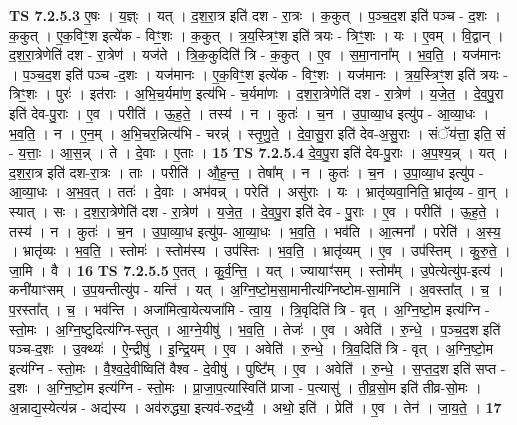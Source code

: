 \documentclass[17pt]{extarticle}
\begin{document}
                  \newline
                                \textbf{ TS 7.2.5.3} \newline
                  ए॒षः । य॒ज्ञ्ः । यत् । द॒श॒रा॒त्र इति॑ दश - रा॒त्रः । क॒कुत् । प॒ञ्च॒द॒श इति॑ पञ्च - द॒शः । क॒कुत् । ए॒क॒विꣳ॒॒श इत्ये॑क - विꣳ॒॒शः । क॒कुत् । त्र॒य॒स्त्रिꣳ॒॒श इति॑ त्रयः - त्रिꣳ॒॒शः । यः । ए॒वम् । वि॒द्वान् । द॒श॒रा॒त्रेणेति॑ दश - रा॒त्रेण॑ । यज॑ते । त्रि॒क॒कुदिति॑ त्रि - क॒कुत् । ए॒व । स॒मा॒नाना᳚म् । भ॒व॒ति॒ । यज॑मानः । प॒ञ्च॒द॒श इति॑ पञ्च -द॒शः । यज॑मानः । ए॒क॒विꣳ॒॒श इत्ये॑क - विꣳ॒॒शः । यज॑मानः । त्र॒य॒स्त्रिꣳ॒॒श इति॑ त्रयः - त्रिꣳ॒॒शः । पुरः॑ । इत॑राः । अ॒भि॒च॒र्यमा॑ण॒ इत्य॑भि - च॒र्यमा॑णः । द॒श॒रा॒त्रेणेति॑ दश - रा॒त्रेण॑ । य॒जे॒त॒ । दे॒व॒पु॒रा इति॑ देव-पु॒राः । ए॒व । परीति॑ । ऊ॒ह॒ते॒ । तस्य॑ । न । कुतः॑ । च॒न । उ॒पा॒व्या॒ध इत्यु॑प - आ॒व्या॒धः । भ॒व॒ति॒ । न । ए॒न॒म् । अ॒भि॒चर॒न्नित्य॑भि - चरन्न्॑ । स्तृ॒णु॒ते॒ । दे॒वा॒सु॒रा इति॑ देव-अ॒सु॒राः । संॅय॑त्ता॒ इति॒ सं - य॒त्ताः॒ । आ॒स॒न्न् । ते । दे॒वाः । ए॒ताः । \textbf{  15} \newline
                  \newline
                                \textbf{ TS 7.2.5.4} \newline
                  दे॒व॒पु॒रा इति॑ देव-पु॒राः । अ॒प॒श्य॒न्न् । यत् । द॒श॒रा॒त्र इति॑ दश-रा॒त्रः । ताः । परीति॑ । औ॒ह॒न्त॒ । तेषा᳚म् । न । कुतः॑ । च॒न । उ॒पा॒व्या॒ध इत्यु॑प - आ॒व्या॒धः । अ॒भ॒व॒त् । ततः॑ । दे॒वाः । अभ॑वन्न् । परेति॑ । असु॑राः । यः । भ्रातृ॑व्यवा॒निति॒ भ्रातृ॑व्य - वा॒न् । स्यात् । सः । द॒श॒रा॒त्रेणेति॑ दश - रा॒त्रेण॑ । य॒जे॒त॒ । दे॒व॒पु॒रा इति॑ देव - पु॒राः । ए॒व । परीति॑ । ऊ॒ह॒ते॒ । तस्य॑ । न । कुतः॑ । च॒न । उ॒पा॒व्या॒ध इत्यु॑प- आ॒व्या॒धः । भ॒व॒ति॒ । भव॑ति । आ॒त्मना᳚ । परेति॑ । अ॒स्य॒ । भ्रातृ॑व्यः । भ॒व॒ति॒ । स्तोमः॑ । स्तोम॑स्य । उप॑स्तिः । भ॒व॒ति॒ । भ्रातृ॑व्यम् । ए॒व । उप॑स्तिम् । कु॒रु॒ते॒ । जा॒मि । वै । \textbf{  16} \newline
                  \newline
                                \textbf{ TS 7.2.5.5} \newline
                  ए॒तत् । कु॒र्व॒न्ति॒ । यत् । ज्यायाꣳ॑सम् । स्तोम᳚म् । उ॒पेत्येत्यु॑प-इत्य॑ । कनी॑याꣳसम् । उ॒प॒यन्तीत्यु॑प - यन्ति॑ । यत् । अ॒ग्नि॒ष्टो॒म॒सा॒मानीत्य॑ग्निष्टोम-सा॒मानि॑ । अ॒वस्ता᳚त् । च॒ । प॒रस्ता᳚त् । च॒ । भव॑न्ति । अजा॑मित्वा॒येत्यजा॑मि - त्वा॒य॒ । त्रि॒वृदिति॑ त्रि - वृत् । अ॒ग्नि॒ष्टो॒म इत्य॑ग्नि - स्तो॒मः । अ॒ग्नि॒ष्टुदित्य॑ग्नि-स्तुत् । आ॒ग्ने॒यीषु॑ । भ॒व॒ति॒ । तेजः॑ । ए॒व । अवेति॑ । रु॒न्धे॒ । प॒ञ्च॒द॒श इति॑ पञ्च-द॒शः । उ॒क्थ्यः॑ । ऐ॒न्द्रीषु॑ । इ॒न्द्रि॒यम् । ए॒व । अवेति॑ । रु॒न्धे॒ । त्रि॒व॒दिति॑ त्रि - वृत् । अ॒ग्नि॒ष्टो॒म इत्य॑ग्नि - स्तो॒मः । वै॒श्व॒दे॒वीष्विति॑ वैश्व - दे॒वीषु॑ । पुष्टि᳚म् । ए॒व । अवेति॑ । रु॒न्धे॒ । स॒प्त॒द॒श इति॑ सप्त - द॒शः । अ॒ग्नि॒ष्टो॒म इत्य॑ग्नि - स्तो॒मः । प्रा॒जा॒प॒त्यास्विति॑ प्राजा - प॒त्यासु॑ । ती॒व्र॒सो॒म इति॑ तीव्र-सो॒मः । अ॒न्नाद्य॒स्येत्य॑न्न - अद्य॑स्य । अव॑रुद्ध्या॒ इत्यव॑-रुद्॒ध्यै॒ । अथो॒ इति॑ । प्रेति॑ । ए॒व । तेन॑ । जा॒य॒ते॒ । \textbf{  17} \newline
\end{document}
